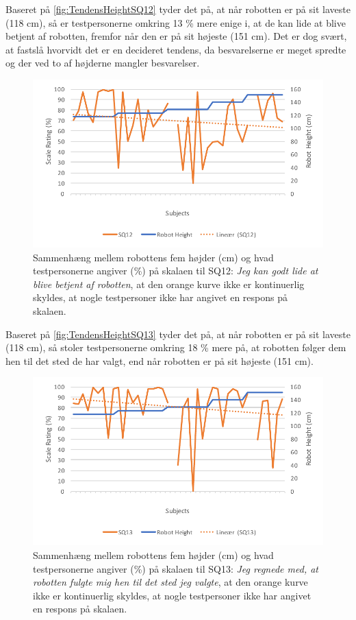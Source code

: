 \noindent
%
Baseret på \autoref{fig:TendensHeightSQ12} tyder det på, at når robotten er på sit laveste (118 cm), så er testpersonerne omkring 13 \% mere enige i, at de kan lide at blive betjent af robotten, fremfor når den er på sit højeste (151 cm). Det er dog svært, at fastslå hvorvidt det er en decideret tendens, da besvarelserne er meget spredte og der ved to af højderne mangler besvarelser.   
%
\begin{figure}[H]
\centering
\includegraphics[width=\textwidth]{Figure/DatabehandlingSkalaer/TendensHeight/HeightSQ12}
\caption{Sammenhæng mellem robottens fem højder (cm) og hvad testpersonerne angiver (\%) på skalaen til SQ12: \textit{Jeg kan godt lide at blive betjent af robotten}, at den orange kurve ikke er kontinuerlig skyldes, at nogle testpersoner ikke har angivet en respons på skalaen.}
\label{fig:TendensHeightSQ12}
\end{figure}
\noindent
%
Baseret på \autoref{fig:TendensHeightSQ13} tyder det på, at når robotten er på sit laveste (118 cm), så stoler testpersonerne omkring 18 \% mere på, at robotten følger dem hen til det sted de har valgt, end når robotten er på sit højeste (151 cm). 
%
\begin{figure}[H]
\centering
\includegraphics[width=\textwidth]{Figure/DatabehandlingSkalaer/TendensHeight/HeightSQ13}
\caption{Sammenhæng mellem robottens fem højder (cm) og hvad testpersonerne angiver (\%) på skalaen til SQ13: \textit{Jeg regnede med, at robotten fulgte mig hen til det sted jeg valgte}, at den orange kurve ikke er kontinuerlig skyldes, at nogle testpersoner ikke har angivet en respons på skalaen.}
\label{fig:TendensHeightSQ13}
\end{figure}
